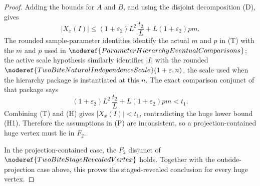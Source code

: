 \begin{proof}
Adding the bounds for \(A\) and \(B\), and using the disjoint decomposition
(D), gives
\[
|X_x(I)|
\le
(1+\varepsilon_2)L^2\,\frac{t_2}{L}
{}+
L(1+\varepsilon_2)pm. \tag{T}
\]
The rounded sample-parameter identities identify the actual \(m\) and \(p\)
in (T) with the \(m\) and \(p\) used in
\(\noderef{ParameterHierarchyEventualComparisons}\); the active scale
hypothesis similarly identifies \(|I|\) with the rounded
\(\noderef{TwoBiteNaturalIndependenceScale}(1+\varepsilon,n)\), the scale used
when the hierarchy package is instantiated at this \(n\).  The exact
comparison conjunct of that package says
\[
(1+\varepsilon_2)L^2\,\frac{t_2}{L}
{}+
L(1+\varepsilon_2)pm
<t_1. \tag{H}
\]
Combining (T) and (H) gives \(|X_x(I)|<t_1\), contradicting the huge lower
bound (H1).  Therefore the assumptions in (P) are inconsistent, so a
projection-contained huge vertex must lie in
\(F_2\).

In the projection-contained case, the \(F_2\) disjunct of
\(\noderef{TwoBiteStageRevealedVertex}\) holds.  Together with the
outside-projection case above, this proves the staged-revealed conclusion for
every huge vertex.
\end{proof}

